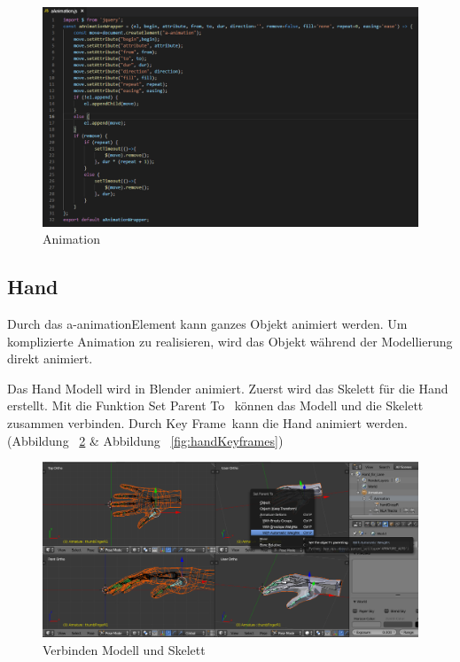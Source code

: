 \begin{figure}[ht]
\vspace*{0.6cm}
\centering
\includegraphics[width=\textwidth]{images/aAnimation.png}
\caption[Animation]{Animation}
\label{fig:aAnimation} 
\end{figure}
 
 \subsection{Hand}
 
 Durch das \glqq a-animation\grqq Element kann ganzes Objekt animiert werden. Um komplizierte Animation zu realisieren, wird das Objekt während der Modellierung direkt animiert.
 
 Das Hand Modell wird in Blender animiert. Zuerst wird das Skelett für die Hand erstellt. Mit die Funktion \glqq Set Parent To \grqq\ können das Modell und die Skelett zusammen verbinden. Durch \glqq Key Frame\grqq\ kann die Hand animiert werden. (Abbildung ~\ref{fig:handSetParentTo} \& Abbildung ~\ref{fig:handKeyframes})
 
\begin{figure}[ht]
\vspace*{0.2cm}
\centering
\includegraphics[width=\textwidth]{images/handSetParentTo.png}
\caption[Verbinden Modell und Skelett]{Verbinden Modell und Skelett}
\label{fig:handSetParentTo} 
\end{figure}

